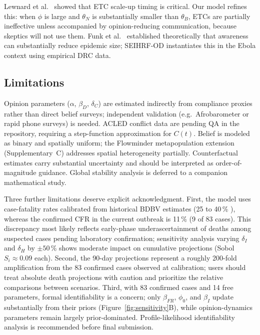 \documentclass[12pt,a4paper]{article}
\begin{document}
Lewnard et al.\ \citep{Lewnard2014} showed that ETC scale-up timing is
critical. Our model refines this: when $\phi$ is large and $\theta_N$ is substantially smaller than $\theta_B$,
ETCs are partially ineffective unless accompanied by opinion-reducing
communication, because skeptics will not use them. Funk et al.\ \citep{Funk2010}
established theoretically that awareness can substantially reduce epidemic size;
SEIHRF-OD instantiates this in the Ebola context using empirical DRC data.

\subsection{Limitations}

Opinion parameters ($\alpha$, $\beta_D$, $\delta_C$) are estimated
indirectly from compliance proxies rather than direct belief surveys;
independent validation (e.g.\ Afrobarometer or rapid phone surveys) is
needed. ACLED conflict data are pending QA in the repository, requiring a
step-function approximation for $C(t)$. Belief is modeled as binary and
spatially uniform; the Flowminder metapopulation extension (Supplementary~C)
addresses spatial heterogeneity partially. Counterfactual estimates carry
substantial uncertainty and should be interpreted as order-of-magnitude
guidance. Global stability analysis is deferred to a companion mathematical
study.

Three further limitations deserve explicit acknowledgment. First, the model uses case-fatality rates calibrated from historical BDBV
estimates (25 to 40\,\% \citep{Towner2008}), whereas the confirmed CFR
in the current outbreak is 11\,\% (9 of 83 cases). This discrepancy most
likely reflects early-phase underascertainment of deaths among suspected
cases pending laboratory confirmation; sensitivity analysis varying
$\delta_I$ and $\delta_H$ by $\pm 50$\,\% shows moderate impact on
cumulative projections (Sobol $S_i \approx 0.09$ each). Second, the 90-day projections represent a roughly 200-fold amplification
from the 83 confirmed cases observed at calibration; users should treat
absolute death projections with caution and prioritize the relative
comparisons between scenarios. Third, with 83 confirmed cases and 14 free parameters, formal
identifiability is a concern; only $\beta_{FR}$, $\phi_0$, and
$\beta_I$ update substantially from their priors
(Figure~\ref{fig:sensitivity}B), while opinion-dynamics parameters
remain largely prior-dominated. Profile-likelihood identifiability
analysis is recommended before final submission.
\end{document}
